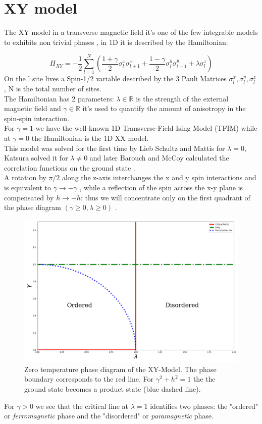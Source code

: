 \documentclass[12pt,a4paper]{book}
\theoremstyle{definition}
\begin{document}
\section{XY model}
The XY model in a transverse magnetic field it's one of the few integrable models to exhibits non trivial phases \cite{Franchini_2017}, in 1D it is described by the Hamiltonian:

\begin{equation}\label{eq:XYmodelHam}
	H_{X Y}=-\frac{1}{2} \sum_{l=1}^N\left(\frac{1+\gamma}{2} \sigma_{l}^{x} \sigma_{l+1}^{x}+\frac{1-\gamma}{2} \sigma_{l}^{y} \sigma_{l+1}^{y}+\lambda \sigma_{l}^{z}\right)
\end{equation}
On the l site lives a Spin-1/2 variable described by the 3 Pauli Matrices $\sigma_{l}^{x},\sigma_{l}^{y},\sigma_{l}^{z}$ , N is the total number of sites. \\ The Hamiltonian has 2 parameters:
$\lambda \in \mathbb{R}$ is the strength of the external magnetic field and $\gamma \in \mathbb{R}$ it's used to quantify the amount of anisotropy in the spin-spin interaction. \\
For $\gamma=1$ we have the well-known 1D Transverse-Field Ising Model (TFIM) while at $\gamma=0$ the Hamiltonian is the 1D XX model.\\
This model was solved for the first time by Lieb Schultz and Mattis
\cite{LIEB1961407} for $\lambda=0$, Katsura \cite{PhysRev.127.1508} solved it for $\lambda \ne 0$ and later Barouch and McCoy calculated the correlation functions on the ground state  \cite{barouch1} \cite{barouch2} \cite{barouch3}.\\
A rotation by $\pi/2$ along the z-axis interchanges the x and y spin interactions and is equivalent to 
 $\gamma \rightarrow -\gamma$
, while a reflection of the spin across the x-y plane is compensated by $h \rightarrow -h$: thus we will concentrate only on the first quadrant of the phase diagram $(\gamma \ge 0, \lambda \ge 0)$ .

\begin{figure}[h]
	\centering
	\includegraphics[width=0.7\linewidth]{graphs/xymodelphaseplot}
	\caption{Zero temperature phase diagram of the XY-Model. The phase boundary corresponds to the red line. For $\gamma^2+h^2=1$ the the ground state becomes a product state (blue dashed line). }
	\label{fig:phase-diagram-of-the-xy-model}
\end{figure}
For $\gamma>0$ we see that the critical line at $\lambda=1$ identifies two phases: the "ordered" or  \textit{ferromagnetic} phase and the "disordered" or \textit{paramagnetic} phase.\\
\end{document}
